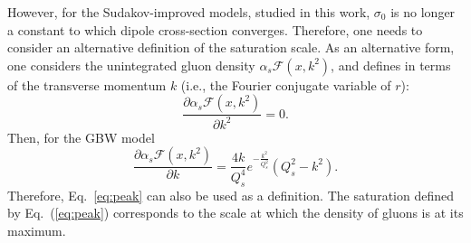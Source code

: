 \documentclass[11pt]{article}
\begin{document}
However, for the Sudakov-improved models, studied in this work, $\sigma_0$ is no longer a constant to which dipole cross-section converges.
Therefore, one needs to consider an alternative definition of the saturation scale.
As an alternative form, one considers the unintegrated gluon density $\alpha_s\mathcal{F}(x,k^2)$,
and defines in terms of the transverse momentum $k$ (i.e., the Fourier conjugate variable of $r$):
\begin{equation}
 \frac{\partial \alpha_s \mathcal{F}(x,k^2)}{\partial k^2}=0.
 \label{eq:peak}
\end{equation}
Then, for the GBW model 
\begin{equation}
\frac{\partial \alpha_s \mathcal{F}(x,k^2)}{\partial k}= \frac{4 k}{Q_s^4} { e^{-\frac{k^2}{Q_s^2}}} \left(Q_s^2-k^2\right).
\end{equation}
Therefore, Eq.~\ref{eq:peak} can also be used as a definition.
The saturation defined by Eq.~(\ref{eq:peak}) corresponds to the scale at which the density of gluons is at its maximum.
\end{document}
